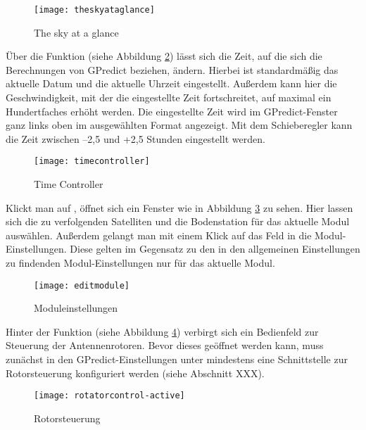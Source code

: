 \begin{figure}[h]
	\centering
	\texttt{[image: theskyataglance]}
	\caption{The sky at a glance}
	\label{fig:theskyataglance} 
\end{figure}

\clearpage

Über die Funktion  (siehe Abbildung \ref{fig:timecontroller}) lässt sich die Zeit, auf die sich die Berechnungen von GPredict beziehen, ändern. Hierbei ist standardmäßig das aktuelle Datum und die aktuelle Uhrzeit eingestellt. Außerdem kann hier die Geschwindigkeit, mit der die eingestellte Zeit fortschreitet, auf maximal ein Hundertfaches erhöht werden. Die eingestellte Zeit wird im GPredict-Fenster ganz links oben im ausgewählten Format angezeigt. Mit dem Schieberegler kann die Zeit zwischen --2,5 und +2,5 Stunden eingestellt werden.

\begin{figure}[h]
	\centering
	\texttt{[image: timecontroller]}
	\caption{Time Controller}
	\label{fig:timecontroller} 
\end{figure}

Klickt man auf , öffnet sich ein Fenster wie in Abbildung \ref{fig:editmodule} zu sehen. Hier lassen sich die zu verfolgenden Satelliten und die Bodenstation für das aktuelle Modul auswählen. Außerdem gelangt man mit einem Klick auf das Feld  in die Modul-Einstellungen. Diese gelten im Gegensatz zu den in den allgemeinen Einstellungen zu findenden Modul-Einstellungen nur für das aktuelle Modul.


\begin{figure}[h]
	\centering
	\texttt{[image: editmodule]}
	\caption{Moduleinstellungen}
	\label{fig:editmodule} 
\end{figure}

\clearpage

Hinter der Funktion  (siehe Abbildung \ref{fig:rotatorcontrol}) verbirgt sich ein Bedienfeld zur Steuerung der Antennenrotoren. Bevor dieses geöffnet werden kann, muss zunächst in den GPredict-Einstellungen unter  mindestens eine Schnittstelle zur Rotorsteuerung konfiguriert werden (siehe Abschnitt XXX). 
\begin{figure}[h]
	\centering
	\texttt{[image: rotatorcontrol-active]}
	\caption{Rotorsteuerung}
	\label{fig:rotatorcontrol} 
\end{figure}


